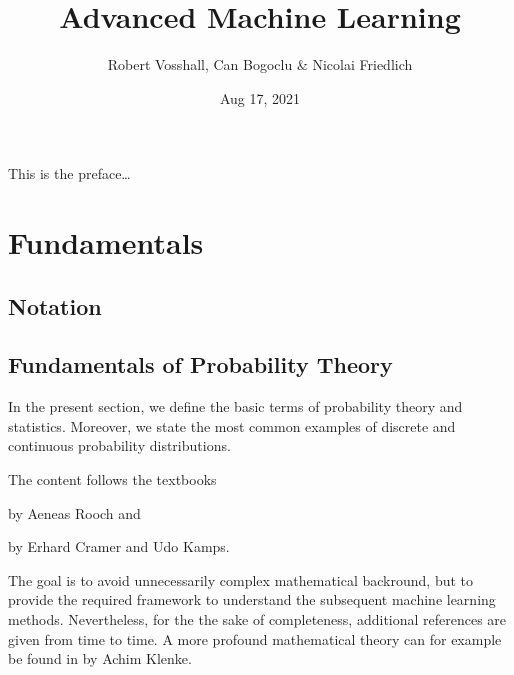 \documentclass[letterpaper,10pt,english]{jupyterBook}
\title{Advanced Machine Learning}
\date{Aug 17, 2021}
\author{Robert Vosshall, Can Bogoclu \& Nicolai Friedlich}
\begin{document}
\pagestyle{empty}
\sphinxmaketitle
\pagestyle{plain}
\sphinxtableofcontents
\pagestyle{normal}
\label{\detokenize{preface::doc}}


\sphinxAtStartPar
This is the preface…


\part{Fundamentals}


\chapter{Notation}
\label{\detokenize{fund/notation:notation}}\label{\detokenize{fund/notation::doc}}

\chapter{Fundamentals of Probability Theory}
\label{\detokenize{fund/fundprob:fundamentals-of-probability-theory}}\label{\detokenize{fund/fundprob::doc}}
\sphinxAtStartPar
In the present section, we define the basic terms of probability theory and statistics. Moreover, we state the most common examples of discrete and continuous probability distributions.

\sphinxAtStartPar
The content follows the textbooks

\sphinxAtStartPar
{}

\sphinxAtStartPar
by Aeneas Rooch and

\sphinxAtStartPar
{}

\sphinxAtStartPar
by Erhard Cramer and Udo Kamps.

\sphinxAtStartPar
The goal is to avoid unnecessarily complex mathematical backround, but to provide the required framework to understand the subsequent machine learning methods. Nevertheless, for the the sake of completeness, additional references are given from time to time. A more profound mathematical theory can for example be found in  by Achim Klenke.
\end{document}
